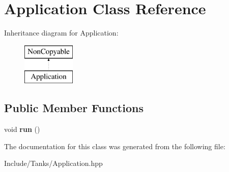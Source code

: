 \hypertarget{class_application}{}\section{Application Class Reference}
\label{class_application}
Inheritance diagram for Application\+:\begin{figure}[H]
\begin{center}
\leavevmode
\includegraphics[height=2.000000cm]{class_application}
\end{center}
\end{figure}
\subsection*{Public Member Functions}
\begin{DoxyCompactItemize}
\item 
\hypertarget{class_application_a68965449404743bf1add056784d6cf81}{}void {\bfseries run} ()\label{class_application_a68965449404743bf1add056784d6cf81}

\end{DoxyCompactItemize}


The documentation for this class was generated from the following file\+:\begin{DoxyCompactItemize}
\item 
Include/\+Tanks/Application.\+hpp\end{DoxyCompactItemize}
